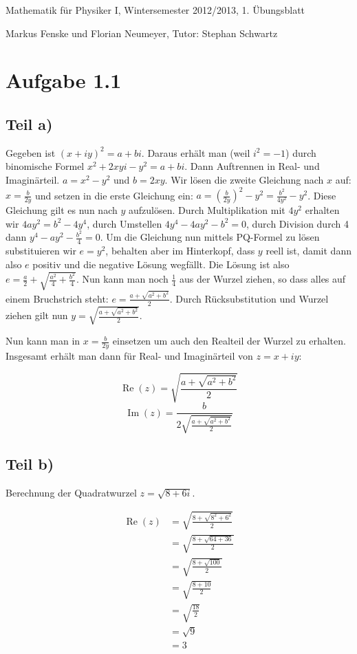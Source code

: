 \documentclass[a4paper,german,12pt]{article}
\begin{document}
Mathematik für Physiker I, Wintersemester 2012/2013, 1. Übungsblatt

Markus Fenske und Florian Neumeyer, Tutor: Stephan Schwartz

\section*{Aufgabe 1.1}
\subsection*{Teil a)}

Gegeben ist $(x+iy)^2 = a+bi$. Daraus erhält man (weil $i^2 = -1$) durch
binomische Formel $x^2+2xyi-y^2 = a+bi$. Dann Auftrennen in Real- und
Imaginärteil. $a = x^2-y^2$ und $b = 2xy$. Wir lösen die zweite Gleichung nach
$x$ auf: $x = \frac{b}{2y}$ und setzen in die erste Gleichung ein: $a =
\left(\frac{b}{2y}\right)^2 - y^2 = \frac{b^2}{4y^2} - y^2$. Diese Gleichung
gilt es nun nach $y$ aufzulösen.  Durch Multiplikation mit $4y^2$ erhalten wir
$4ay^2 = b^2 - 4y^4$, durch Umstellen $4y^4 - 4ay^2 - b^2 = 0$, durch Division
durch 4 dann $y^4 - ay^2 - \frac{b^2}{4} = 0$. Um die Gleichung nun mittels
PQ-Formel zu lösen substituieren wir $e = y^2$, behalten aber im Hinterkopf,
dass $y$ reell ist, damit dann also $e$ positiv und die negative Lösung
wegfällt. Die Lösung ist also $e = \frac{a}{2} + \sqrt{\frac{a^2}{4} +
\frac{b^2}{4}}$. Nun kann man noch $\frac{1}{4}$ aus der Wurzel ziehen, so dass
alles auf einem Bruchstrich steht: $e = \frac{a + \sqrt{a^2 + b^2}}{2}$. Durch
Rücksubstitution und Wurzel ziehen gilt nun $y = \sqrt{\frac{a + \sqrt{a^2 +
b^2}}{2}}$.

Nun kann man in $x = \frac{b}{2y}$ einsetzen um auch den Realteil der Wurzel zu
erhalten. Insgesamt erhält man dann für Real- und Imaginärteil von $z = x+iy$:

$$\operatorname{Re}(z) = \sqrt{\frac{a + \sqrt{a^2 + b^2}}{2}}$$
$$\operatorname{Im}(z) = \frac{b}{2\sqrt{\frac{a + \sqrt{a^2 + b^2}}{2}}}$$

\subsection*{Teil b)}

Berechnung der Quadratwurzel $z = \sqrt{8+6i}$.

\begin{align}
\operatorname{Re}(z) &= \sqrt{\frac{8 + \sqrt{8^2 + 6^2}}{2}} \\
&= \sqrt{\frac{8 + \sqrt{64 + 36}}{2}} \\
&= \sqrt{\frac{8 + \sqrt{100}}{2}} \\
&= \sqrt{\frac{8 + 10}{2}} \\
&= \sqrt{\frac{18}{2}} \\
&= \sqrt{9} \\
&= 3 \\
\end{align}
\end{document}
